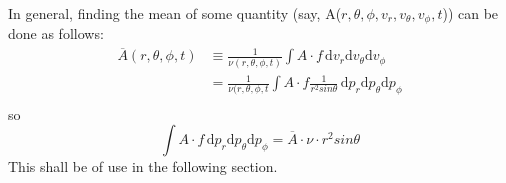 In general, finding the mean of some quantity (say, A($r, \theta, \phi, v_r , v_{\theta}, v_{\phi}, t$)) can be done as follows:
\begin{equation}
\begin{aligned}
\overline{A}(r, \theta, \phi, t) &\equiv \frac{1}{\nu(r, \theta, \phi, t)}\int \! A\cdot f \, \mathrm{d}v_r \mathrm{d}v_{\theta} \mathrm{d}v_{\phi} \\
& = \frac{1}{\nu(r, \theta, \phi, t}\int \! A\cdot f \frac{1}{r^2sin\theta} \, \mathrm{d}p_r \mathrm{d}p_{\theta} \mathrm{d}p_{\phi} \\
\end{aligned}
\end{equation}
so
\begin{equation}
\int \! A\cdot f \, \mathrm{d}p_r \mathrm{d}p_{\theta} \mathrm{d}p_{\phi} = \overline{A}\cdot \nu \cdot r^2 sin\theta
\end{equation}
This shall be of use in the following section.